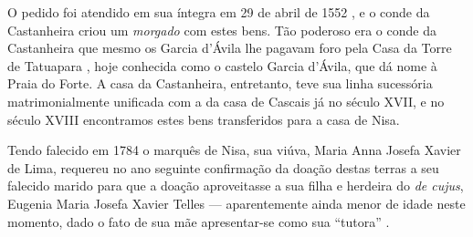 O pedido foi atendido em sua íntegra em 29 de abril de 1552 \cite[p.~III-3 - III-4]{teixeira_doacoes_1978}, e o conde da Castanheira criou um \textit{morgado} com estes bens. Tão poderoso era o conde da Castanheira que mesmo os Garcia d'Ávila lhe pagavam foro pela Casa da Torre de Tatuapara \cite[p.~III-5]{teixeira_doacoes_1978}, hoje conhecida como o castelo Garcia d'Ávila, que dá nome à Praia do Forte. A casa da Castanheira, entretanto, teve sua linha sucessória matrimonialmente unificada com a da casa de Cascais já no século XVII, e no século XVIII encontramos estes bens transferidos para a casa de Nisa.





Tendo falecido em 1784 o marquês de Nisa, sua viúva, Maria Anna Josefa Xavier de Lima, requereu no ano seguinte confirmação da doação destas terras a seu falecido marido para que a doação aproveitasse a sua filha e herdeira do \textit{de cujus}, Eugenia Maria Josefa Xavier Telles --- aparentemente ainda menor de idade neste momento, dado o fato de sua mãe apresentar-se como sua ``tutora'' \cite[p.~592]{castralmeida_ultramar_1910}. 

